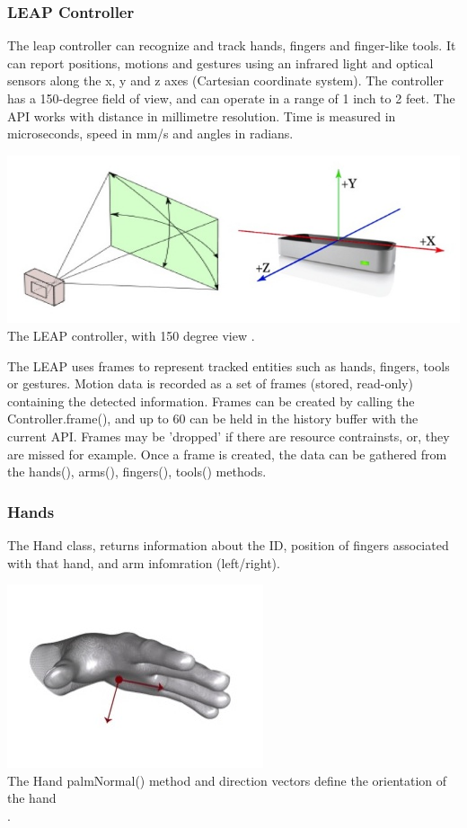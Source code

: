 \documentclass[10pt]{article}
\begin{document}
\subsubsection{LEAP Controller}
The leap controller can recognize and track hands, fingers and finger-like tools. It can report positions, motions and gestures using an infrared light and optical sensors along the x, y and z axes (Cartesian coordinate system). The controller has a 150-degree field of view, and can operate in a range of 1 inch to 2 feet. The API works with distance in millimetre resolution. Time is measured in microseconds, speed in mm/s and angles in radians.

\begin{center}
\includegraphics[scale=0.5]{leap}\\
The LEAP controller, with 150 degree view \cite{leap}.
\end{center}

The LEAP uses frames to represent tracked entities such as hands, fingers, tools or gestures. Motion data is recorded as a set of frames (stored, read-only) containing the detected information. 
Frames can be created by calling the Controller.frame(), and up to 60 can be held in the history buffer with the current API. Frames may be 'dropped' if there are resource contrainsts, or, they are missed for example. Once a frame is created, the data can be gathered from the hands(), arms(), fingers(), tools() methods.

\subsubsection{Hands}
The Hand class, returns information about the ID, position of fingers associated with that hand, and arm infomration (left/right).

\begin{center}
\includegraphics[scale=0.6]{palm}\\
The Hand palmNormal() method and direction vectors define the orientation of the hand \cite{leap}\\.
\end{center}
\end{document}
